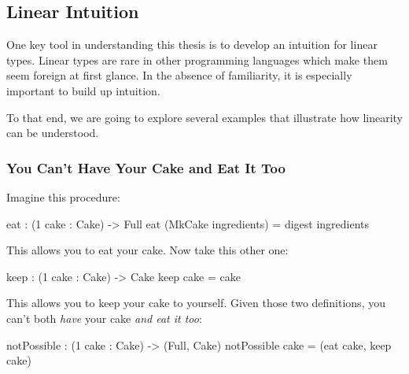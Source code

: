 \documentclass[
]{article}
\newenvironment{Shaded}{}{}
\newcommand{\DataTypeTok}[1]{\textcolor[rgb]{0.56,0.13,0.00}{#1}}
\newcommand{\DecValTok}[1]{\textcolor[rgb]{0.25,0.63,0.44}{#1}}
\newcommand{\NormalTok}[1]{#1}
\newcommand{\OperatorTok}[1]{\textcolor[rgb]{0.40,0.40,0.40}{#1}}
\newcommand{\OtherTok}[1]{\textcolor[rgb]{0.00,0.44,0.13}{#1}}
\begin{document}
\hypertarget{linear-intuition}{%
\subsection{Linear Intuition}\label{linear-intuition}}

One key tool in understanding this thesis is to develop an intuition for
linear types. Linear types are rare in other programming languages which
make them seem foreign at first glance. In the absence of familiarity,
it is especially important to build up intuition.

To that end, we are going to explore several examples that illustrate
how linearity can be understood.

\hypertarget{you-cant-have-your-cake-and-eat-it-too}{%
\subsubsection{You Can't Have Your Cake and Eat It
Too}\label{you-cant-have-your-cake-and-eat-it-too}}

Imagine this procedure:

\begin{Shaded}
\begin{Highlighting}[]
\NormalTok{eat }\OperatorTok{:}\NormalTok{ (}\DecValTok{1}\NormalTok{ cake }\OperatorTok{:} \DataTypeTok{Cake}\NormalTok{) }\OtherTok{{-}\textgreater{}} \DataTypeTok{Full}
\NormalTok{eat (}\DataTypeTok{MkCake}\NormalTok{ ingredients) }\OtherTok{=}\NormalTok{ digest ingredients}
\end{Highlighting}
\end{Shaded}

This allows you to eat your cake. Now take this other one:

\begin{Shaded}
\begin{Highlighting}[]
\NormalTok{keep }\OperatorTok{:}\NormalTok{ (}\DecValTok{1}\NormalTok{ cake }\OperatorTok{:} \DataTypeTok{Cake}\NormalTok{) }\OtherTok{{-}\textgreater{}} \DataTypeTok{Cake}
\NormalTok{keep cake }\OtherTok{=}\NormalTok{ cake}
\end{Highlighting}
\end{Shaded}

This allows you to keep your cake to yourself. Given those two
definitions, you can't both \emph{have} your cake \emph{and eat it too}:

\begin{Shaded}
\begin{Highlighting}[]
\NormalTok{notPossible }\OperatorTok{:}\NormalTok{ (}\DecValTok{1}\NormalTok{ cake }\OperatorTok{:} \DataTypeTok{Cake}\NormalTok{) }\OtherTok{{-}\textgreater{}}\NormalTok{ (}\DataTypeTok{Full}\NormalTok{, }\DataTypeTok{Cake}\NormalTok{)}
\NormalTok{notPossible cake }\OtherTok{=}\NormalTok{ (eat cake, keep cake)}
\end{Highlighting}
\end{Shaded}
\end{document}
